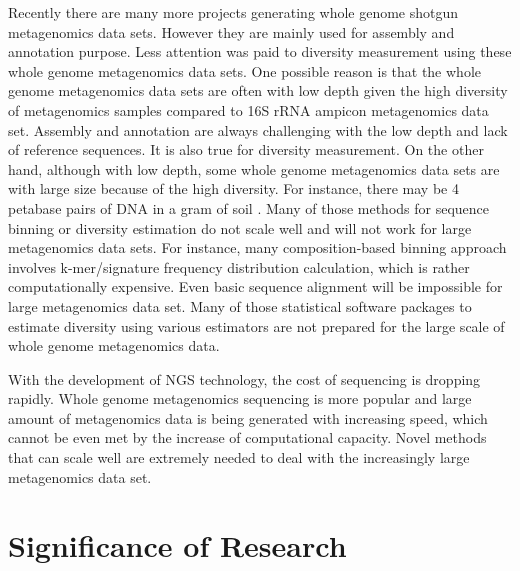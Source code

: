 Recently there are many more projects generating whole genome shotgun
metagenomics data sets. However they are 
mainly used for assembly and annotation purpose. Less attention was paid to
diversity measurement
using these whole genome metagenomics data sets. One possible reason is that
the whole genome metagenomics
data sets are often with low depth given the high diversity of metagenomics
samples compared to 16S rRNA
ampicon metagenomics data set. Assembly and annotation are always challenging
with the low depth and lack of 
reference sequences. It is also true for diversity measurement. On the other
hand, although with low depth, some whole genome metagenomics 
data sets are with large size because of the high diversity. For instance,
there may be 4 petabase
pairs of DNA in a gram of soil \cite{Zarraonaindia:2013aa}. Many of those methods for
sequence binning or diversity 
estimation do not scale well and will not work for large metagenomics data
sets. For instance,
many composition-based binning approach involves k-mer/signature frequency
distribution calculation, which is 
rather computationally expensive. Even basic sequence alignment will be
impossible for large metagenomics data set.
Many of those statistical software packages to estimate diversity using various
estimators are not prepared 
for the large scale of whole genome metagenomics data. 

With the development of NGS technology, the cost of
sequencing is dropping rapidly. Whole genome metagenomics sequencing is more
popular and large amount of metagenomics data is being generated with
increasing speed, which cannot be even met by the increase of computational
capacity. Novel methods that can scale well are extremely needed to deal with
the increasingly large metagenomics data set.


\section{Significance of Research}

